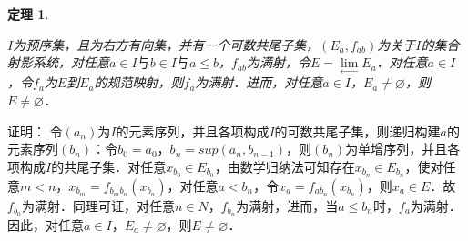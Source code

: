\documentclass[12pt, a4paper, oneside]{book}
\newtheorem{theo}{定理}
\begin{document}
			\begin{theo}\label{theo181}
				\hfill\par
				$I$为预序集，且为右方有向集，并有一个可数共尾子集，$(E_a, f_{ab})$为关于$I$的集合射影系统，对任意$a\in I\text{与}b\in I\text{与}a\leq b$，$f_{ab}$为满射，令$E=\lim\limits_\gets E_a$．对任意$a\in I$，令$f_a$为$E$到$E_a$的规范映射，则$f_a$为满射．进而，对任意$a\in I$，$E_a\neq \varnothing$，则$E\neq \varnothing$．
			\end{theo}
			证明：
			令$(a_n)$为$I$的元素序列，并且各项构成$I$的可数共尾子集，则递归构建$a$的元素序列$(b_n)$：令$b_0=a_0$，$b_n=sup(a_n, b_{n-1})$，则$(b_n)$为单增序列，并且各项构成$I$的共尾子集．对任意$x_{b_0}\in E_{b_0}$，由数学归纳法可知存在$x_{b_n}\in E_{b_n}$，使对任意$m<n$，$x_{b_m}=f_{b_mb_n}(x_{b_n})$，对任意$a<b_n$，令$x_a=f_{ab_n}(x_{b_n})$，则$x_a\in E$．故$f_{b_0}$为满射．同理可证，对任意$n\in N$，$f_{b_n}$为满射，进而，当$a\leq b_n$时，$f_a$为满射．因此，对任意$a\in I$，$E_a\neq \varnothing$，则$E\neq \varnothing$．
					
\end{document}
